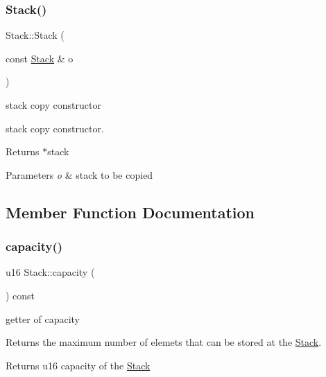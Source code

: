 \subsubsection{\texorpdfstring{Stack()}{Stack()}\hspace{0.1cm}{\footnotesize\ttfamily [3/3]}}
{\footnotesize\ttfamily Stack\+::\+Stack (\begin{DoxyParamCaption}\item[{const \hyperlink{class_stack}{Stack} \&}]{o }\end{DoxyParamCaption})}



stack copy constructor 

stack copy constructor.

\begin{DoxyReturn}{Returns}
$\ast$stack 
\end{DoxyReturn}

\begin{DoxyParams}{Parameters}
{\em o} & stack to be copied \\
\hline
\end{DoxyParams}


\subsection{Member Function Documentation}
\mbox{\label{class_stack_a3bb579836ffee2ddc1eb7cb0bfa02b43}} 
\subsubsection{\texorpdfstring{capacity()}{capacity()}}
{\footnotesize\ttfamily u16 Stack\+::capacity (\begin{DoxyParamCaption}{ }\end{DoxyParamCaption}) const}



getter of capacity 

Returns the maximum number of elemets that can be stored at the \hyperlink{class_stack}{Stack}.

\begin{DoxyReturn}{Returns}
u16 capacity of the \hyperlink{class_stack}{Stack} 
\end{DoxyReturn}
\mbox{\label{class_stack_a43140f1be6fde2389b8fabde77d124c1}} 
